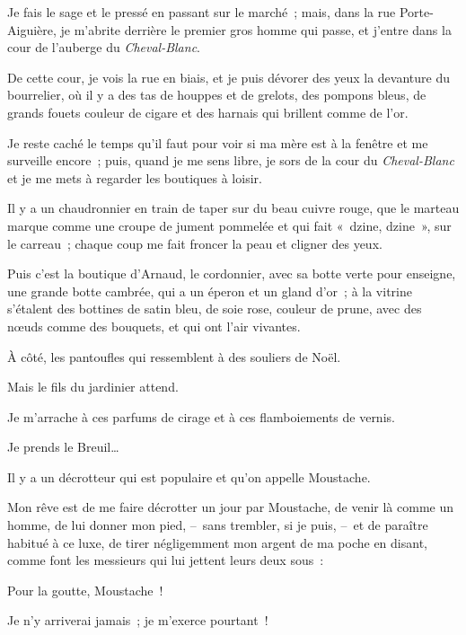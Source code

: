 \documentclass[french,twoside]{book} %
\newenvironment{quoteblock}%
  {\begin{quoting}}
  {\end{quoting}}
\newenvironment{quotebar}{%
    \def\FrameCommand{{\color{rubric!10!}\vrule width 0.5em} \hspace{0.9em}}%
    \def\OuterFrameSep{\itemsep} %
    \MakeFramed {\advance\hsize-\width \FrameRestore}
  }%
  {%
    \endMakeFramed
  }
\renewenvironment{quoteblock}%
  {%
    \savenotes
    \setstretch{0.9}
    \normalfont
    \begin{quotebar}
  }
  {%
    \end{quotebar}
    \spewnotes
  }
\begin{document}
Je fais le sage et le pressé en passant sur le marché ; mais, dans la rue Porte-Aiguière, je m’abrite derrière le premier gros homme qui passe, et j’entre dans la cour de l’auberge du \emph{Cheval-Blanc}.\par
De cette cour, je vois la rue en biais, et je puis dévorer des yeux la devanture du bourrelier, où il y a des tas de houppes et de grelots, des pompons bleus, de grands fouets couleur de cigare et des harnais qui brillent comme de l’or.\par
Je reste caché le temps qu’il faut pour voir si ma mère est à la fenêtre et me surveille encore ; puis, quand je me sens libre, je sors de la cour du \emph{Cheval-Blanc} et je me mets à regarder les boutiques à loisir.\par
\bigbreak
\noindent Il y a un chaudronnier en train de taper sur du beau cuivre rouge, que le marteau marque comme une croupe de jument pommelée et qui fait « dzine, dzine », sur le carreau ; chaque coup me fait froncer la peau et cligner des yeux.\par
Puis c’est la boutique d’Arnaud, le cordonnier, avec sa botte verte pour enseigne, une grande botte cambrée, qui a un éperon et un gland d’or ; à la vitrine s’étalent des bottines de satin bleu, de soie rose, couleur de prune, avec des nœuds comme des bouquets, et qui ont l’air vivantes.\par
À côté, les pantoufles qui ressemblent à des souliers de Noël.\par
Mais le fils du jardinier attend.\par
Je m’arrache à ces parfums de cirage et à ces flamboiements de vernis.\par
\bigbreak
\noindent Je prends le Breuil…\par
Il y a un décrotteur qui est populaire et qu’on appelle Moustache.\par
Mon rêve est de me faire décrotter un jour par Moustache, de venir là comme un homme, de lui donner mon pied, – sans trembler, si je puis, – et de paraître habitué à ce luxe, de tirer négligemment mon argent de ma poche en disant, comme font les messieurs qui lui jettent leurs deux sous :\par

\begin{quoteblock}
\noindent Pour la goutte, Moustache !\end{quoteblock}

\noindent Je n’y arriverai jamais ; je m’exerce pourtant !\par
\end{document}

